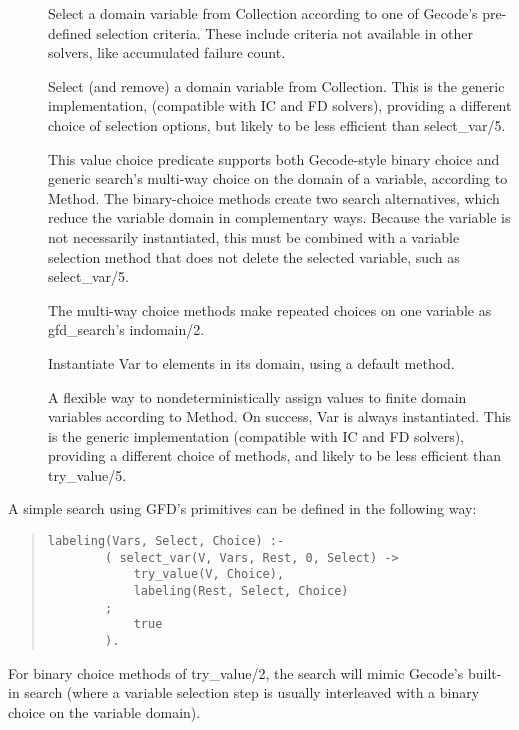 \begin{description}
\item[]
Select a domain variable from Collection according to one of Gecode's
pre-defined selection criteria.  These include criteria not available in
other {\eclipse} solvers, like accumulated failure count.

\item[]
Select (and remove) a domain variable from Collection.  This is the
generic implementation, (compatible with IC and FD solvers), providing
a different choice of selection options, but likely to be less
efficient than select_var/5.

\item[]
This value choice predicate supports both Gecode-style binary choice and 
generic search's multi-way choice on the domain of a variable,
according to Method.
The binary-choice methods create two search alternatives, which reduce the variable domain
in complementary ways.  Because the variable is not necessarily instantiated,
this must be combined with a variable selection method that does not delete
the selected variable, such as select_var/5.

The multi-way choice methods make repeated choices on one variable as 
gfd_search's indomain/2.

\item[]
Instantiate Var to elements in its domain, using a default method.

\item[]
A flexible way to nondeterministically assign values to finite domain
variables according to Method.  On success, Var is always instantiated.
This is the generic implementation
(compatible with IC and FD solvers), providing a different choice of methods,
and likely to be less efficient than try_value/5.
\end{description}

A simple search using GFD's primitives can be defined in the following way: 
\begin{quote}
\begin{verbatim}
labeling(Vars, Select, Choice) :-
        ( select_var(V, Vars, Rest, 0, Select) ->
            try_value(V, Choice),
            labeling(Rest, Select, Choice)
        ;
            true
        ).
\end{verbatim}
\end{quote}
For binary choice methods of try_value/2, the search will 
mimic Gecode's built-in search (where a variable selection step is usually
interleaved with a binary choice on the variable domain).

